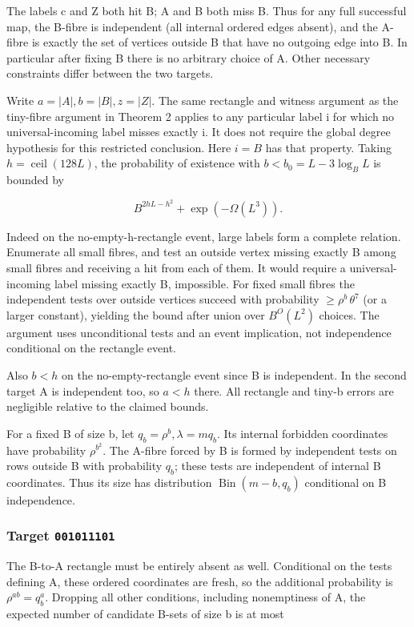\documentclass[11pt]{article}
\begin{document}
The labels c and Z both hit B; A and B both miss B. Thus for any full successful map, the B-fibre is independent (all internal ordered edges absent), and the A-fibre is exactly the set of vertices outside B that have no outgoing edge into B. In particular after fixing B there is no arbitrary choice of A. Other necessary constraints differ between the two targets.

Write $a=|A|, b=|B|, z=|Z|$. The same rectangle and witness argument as the tiny-fibre argument in Theorem 2 applies to any particular label i for which no universal-incoming label misses exactly i. It does not require the global degree hypothesis for this restricted conclusion. Here $i=B$ has that property. Taking $h=\operatorname{ceil}(128 L)$, the probability of existence with $b<b_{0}=L-3 \log _{B} L$ is bounded by

\[
B^{2hL-h^2}+\exp(-\Omega(L^3)).
\]

Indeed on the no-empty-h-rectangle event, large labels form a complete relation. Enumerate all small fibres, and test an outside vertex missing exactly B among small fibres and receiving a hit from each of them. It would require a universal-incoming label missing exactly B, impossible. For fixed small fibres the independent tests over outside vertices succeed with probability $\geq \rho ^{b}\,\theta ^{7}$ (or a larger constant), yielding the bound after union over $B^{O}(L^{2})$ choices. The argument uses unconditional tests and an event implication, not independence conditional on the rectangle event.

Also $b<h$ on the no-empty-rectangle event since B is independent. In the second target A is independent too, so $a<h$ there. All rectangle and tiny-b errors are negligible relative to the claimed bounds.

For a fixed B of size b, let $q_{b}=\rho ^{b}, \lambda =m q_{b}$. Its internal forbidden coordinates have probability $\rho ^{b^{2}}$. The A-fibre forced by B is formed by independent tests on rows outside B with probability $q_{b}$; these tests are independent of internal B coordinates. Thus its size has distribution $\operatorname{Bin}(m-b,q_{b})$ conditional on B independence.

\subsubsection{Target \texttt{001011101}}

The B-to-A rectangle must be entirely absent as well. Conditional on the tests defining A, these ordered coordinates are fresh, so the additional probability is $\rho ^{ab}=q_{b}^{a}$. Dropping all other conditions, including nonemptiness of A, the expected number of candidate B-sets of size b is at most
\end{document}
